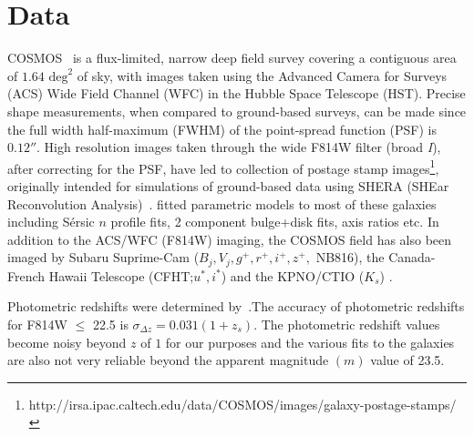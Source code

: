 \documentclass[twocolumn,useAMS,usenatbib]{mn2e}
\newcommand{\mg}{\ensuremath{M_G}}
\newcommand{\mi}{\ensuremath{M_I}}
\newcommand{\sersicn}{S\'{e}rsic $n$ }
\newcommand{\btt}{Bulge-to-Total }
\begin{document}
\section{Data}
\label{S:data}
COSMOS~\citep{COSMOS_overview, COSMOS_generic, COSMOS_Alexie} is a flux-limited, narrow deep field survey covering a contiguous area of $1.64 \text{ deg}^2$ of sky, with images taken using the Advanced Camera for Surveys (ACS) Wide Field Channel (WFC)
in the Hubble Space Telescope (HST). Precise shape measurements, when compared to ground-based surveys, can be made since the full width half-maximum (FWHM) of the point-spread function (PSF)
is $0.12''$.
High resolution images taken through the wide F814W filter (broad \emph{I}), after correcting for the PSF, have led to collection of postage stamp images\footnote{http://irsa.ipac.caltech.edu/data/COSMOS/images/galaxy-postage-stamps/}, originally intended for simulations of ground-based data using SHERA (SHEar Reconvolution Analysis)~\citep{SHERA}.
\cite{Claire_Fits} fitted parametric models to most of these galaxies including \sersicn profile fits, 
2 component bulge+disk fits, axis ratios etc. In addition to the ACS/WFC (F814W) imaging, the COSMOS field has also been imaged by Subaru Suprime-Cam ($B_j, V_j, g^+,r^+,i^+,z^+,$ NB816), the
Canada-French Hawaii Telescope (CFHT;$u^*,i^*$) and the KPNO/CTIO ($K_s$) .

Photometric redshifts were determined by~\cite{COSMOS_photoz}.The accuracy of photometric redshifts for F814W $\le$ 22.5 is $\sigma_{\Delta z} = 0.031(1+z_s)$.
The photometric redshift values become noisy beyond $z$ of $1$ for our purposes and the various fits to the galaxies are also not very reliable beyond the apparent magnitude $(m)$ value of 23.5. 
\end{document}
